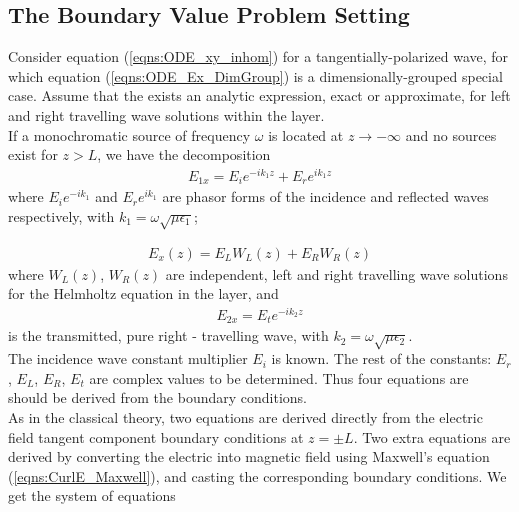 \documentclass[twocolumn,secnumarabic,amssymb, nobibnotes, aps, prd]{revtex4-1}
\begin{document}
\subsection{The Boundary Value Problem Setting}
Consider equation (\ref{eqns:ODE_xy_inhom}) for a tangentially-polarized wave, for which equation (\ref{eqns:ODE_Ex_DimGroup}) is a dimensionally-grouped special case. Assume that the exists an analytic expression, exact or approximate, for left and right travelling wave solutions within the layer.\\
If a monochromatic source of frequency $\omega$ is located at $z \rightarrow -\infty$ and no sources exist for $z>L$, we have the decomposition
\begin{align}
E_{1x} = E_{i}e^{-i k_1 z} + E_{r}e^{i k_1 z}
\end{align}
where $E_i e^{-i k_1}$ and $E_r e^{i k_1}$ are phasor forms of the incidence and reflected waves respectively, with $k_1 = \omega \sqrt{\mu \epsilon_1}$;

\begin{align}
E_x(z) = E_L W_L(z) + E_R W_R(z)
\end{align}
where $W_L(z)$, $W_R(z)$ are independent, left and right travelling wave solutions for the Helmholtz equation in the layer, and 
\begin{align}
E_{2x} = E_t e^{-i k_2 z}
\end{align}
is the transmitted, pure right - travelling wave, with $k_2 = \omega \sqrt{\mu \epsilon_2}$.\\
The incidence wave constant multiplier $E_i$ is known. The rest of the constants: $E_r$, $E_L$, $E_R$, $E_t$ are complex values to be  determined. Thus four equations are should be derived from the boundary conditions. \\ 
As in the classical theory, two equations are derived directly from the electric field tangent component boundary conditions at $z=\pm L$.  Two extra equations are derived by converting the electric into magnetic field using Maxwell's equation (\ref{eqns:CurlE_Maxwell}),  and casting the corresponding boundary conditions. We get the system of equations
\end{document}
